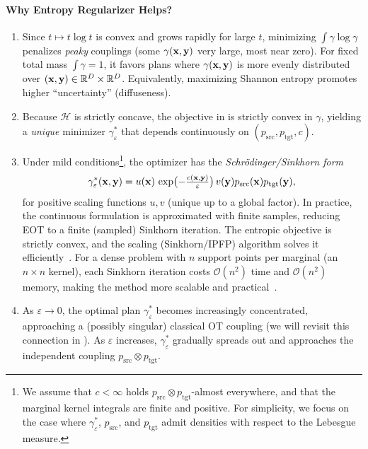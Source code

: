 \paragraph{Why Entropy Regularizer Helps?}
\begin{enumerate}
  \item {}
  Since $t\mapsto t\log t$ is convex and grows rapidly for large $t$, minimizing $\int \gamma\log\gamma$
  penalizes \emph{peaky} couplings (some $\gamma({\mathbf{x}},{\mathbf{y}})$ very large, most near zero).
  For fixed total mass $\int \gamma=1$, it favors plans where $\gamma({\mathbf{x}},{\mathbf{y}})$ is more evenly distributed
  over $({\mathbf{x}},{\mathbf{y}})\in\mathbb{R}^D\times\mathbb{R}^D$.
  Equivalently, maximizing Shannon entropy promotes higher ``uncertainty'' (diffuseness).

  \item {}
  Because $\mathcal{H}$ is strictly concave, the objective in  is strictly convex in $\gamma$,
  yielding a \emph{unique} minimizer $\gamma^*_\varepsilon$ that depends continuously on $(p_{\mathrm{src}},p_{\mathrm{tgt}},c)$.

  \item {}
  Under mild conditions\footnote{We assume that $c<\infty$ holds $p_{\mathrm{src}}\otimes p_{\mathrm{tgt}}$-almost everywhere, and that the marginal kernel integrals are finite and positive. 
For simplicity, we focus on the case where $\gamma^*_\varepsilon$, $p_{\mathrm{src}}$, and $p_{\mathrm{tgt}}$ admit densities with respect to the Lebesgue measure.
},
  the optimizer has the \emph{Schrödinger/Sinkhorn form}
  \[
  \gamma^*_\varepsilon({\mathbf{x}},{\mathbf{y}}) = u({\mathbf{x}})\, \exp \bigl(-\tfrac{c({\mathbf{x}},{\mathbf{y}})}{\varepsilon}\bigr)  \,v({\mathbf{y}})p_{\mathrm{src}}({\mathbf{x}}) p_{\mathrm{tgt}}({\mathbf{y}}),
  \]
  for positive scaling functions $u,v$ (unique up to a global factor). In practice, the continuous formulation is approximated with finite samples, reducing EOT to a finite (sampled) Sinkhorn iteration. 
The entropic objective is strictly convex, and the scaling (Sinkhorn/IPFP) algorithm solves it efficiently~\citep{sinkhorn1964relationship,cuturi2013sinkhorn}. 
For a dense problem with $n$ support points per marginal (an $n\times n$ kernel), each Sinkhorn iteration costs $\mathcal{O}(n^2)$ time and $\mathcal{O}(n^2)$ memory, 
making the method more scalable and practical~\citep{altschuler2017near}.

  \item {}
As $\varepsilon \to 0$, the optimal plan $\gamma^*_\varepsilon$ becomes increasingly concentrated, approaching a (possibly singular) classical OT coupling (we will revisit this connection in ). 
As $\varepsilon$ increases, $\gamma^*_\varepsilon$ gradually spreads out and approaches the independent coupling $p_{\mathrm{src}}\otimes p_{\mathrm{tgt}}$. 
\end{enumerate}



